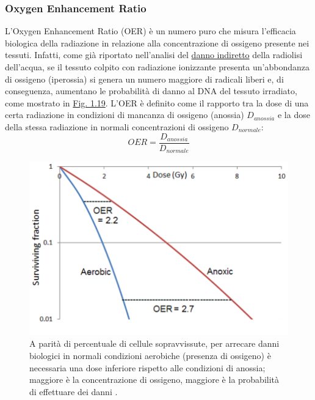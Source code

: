 \documentclass[12pt,a4paper,twoside]{report}
\begin{document}
	\subsubsection{Oxygen Enhancement Ratio}\label{par:oer}
	L'Oxygen Enhancement Ratio (OER) è un numero puro che misura l'efficacia biologica della radiazione in relazione alla concentrazione di ossigeno presente nei tessuti. Infatti, come già riportato nell'analisi del \hyperref[par:danno_indiretto]{danno indiretto} della radiolisi dell'acqua, se il tessuto colpito con radiazione ionizzante presenta un'abbondanza di ossigeno (iperossia) si genera un numero maggiore di radicali liberi e, di conseguenza, aumentano le probabilità di danno al DNA del tessuto irradiato, come mostrato in \hyperref[fig:oer_survival]{Fig. 1.19}. L'OER è definito come il rapporto tra la dose di una certa radiazione in condizioni di mancanza di ossigeno (anossia) $D_{anossia}$ e la dose della stessa radiazione in normali concentrazioni di ossigeno $D_{normale}$:
	\begin{equation}
		OER=\frac{D_{anossia}}{D_{normale}}
		\label{eq:oer}
	\end{equation}
	\begin{figure}[H]
		\centering
		\includegraphics[width=0.73\linewidth]{oer_survival.png}
		\caption{A parità di percentuale di cellule sopravvissute, per arrecare danni biologici in normali condizioni aerobiche (presenza di ossigeno) è necessaria una dose inferiore rispetto alle condizioni di anossia; maggiore è la concentrazione di ossigeno, maggiore è la probabilità di effettuare dei danni \cite{ox_effect_wiki}.}
		\label{fig:oer_survival}
	\end{figure}
\end{document}
